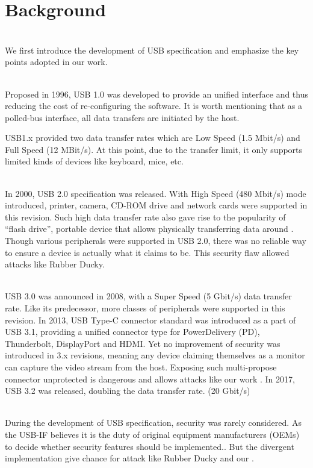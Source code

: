 \section{Background}
\label{sec:background}
\noindent{}\\
We first introduce the development of USB specification and emphasize the key points adopted in our work.

\noindent{}\\
Proposed in 1996, USB 1.0\cite{usb10} was developed to provide an unified interface and thus reducing the cost of re-configuring the software. It is worth mentioning that as a polled-bus interface, all data transfers are initiated by the host.

USB1.x\cite{usb10}\cite{usb11} provided two data transfer rates which are Low Speed (1.5 Mbit/s) and Full Speed (12 MBit/s). At this point, due to the transfer limit, it only supports limited kinds of devices like keyboard, mice, etc.

\noindent{}\\
In 2000, USB 2.0\cite{usb20} specification was released. With High Speed (480 Mbit/s) mode introduced, printer, camera, CD-ROM drive and network cards were supported in this revision. Such high data transfer rate also gave rise to the popularity of ``flash drive'', portable device that allows physically transferring data around \cite{sok}. Though various peripherals were supported in USB 2.0, there was no reliable way to ensure a device is actually what it claims to be. This security flaw allowed attacks like Rubber Ducky\cite{rubber}.

\noindent{}\\
USB 3.0\cite{usb30} was announced in 2008, with a Super Speed (5 Gbit/s) data transfer rate. Like its predecessor, more classes of peripherals were supported in this revision. In 2013, USB Type-C connector standard was introduced as a part of USB 3.1\cite{usb31}, providing a unified connector type for PowerDelivery (PD), Thunderbolt, DisplayPort and HDMI.  Yet no improvement of security was introduced in 3.x revisions, meaning any device claiming themselves as a monitor can capture the video stream from the host. Exposing such multi-propose connector unprotected is dangerous and allows attacks like our work \tool. In 2017, USB 3.2\cite{usb32} was released, doubling the data transfer rate. (20 Gbit/s)

\noindent{}\\
During the development of USB specification, security was rarely considered.  As the USB-IF believes it is the duty of original equipment manufacturers (OEMs) to decide whether security features should be implemented.. But the divergent implementation give chance for attack like Rubber Ducky\cite{rubber} and our \tool.